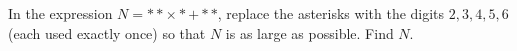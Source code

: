 In the expression $N=**\times*+**$, replace the asterisks with the digits $2,3,4,5,6$ (each used exactly once) so that $N$ is as large as possible. Find $N$.
